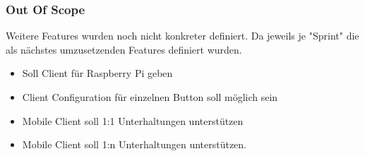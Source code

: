 \subsubsection*{Out Of Scope}

Weitere Features wurden noch nicht konkreter definiert. Da jeweils je "Sprint" die als nächstes umzusetzenden Features definiert wurden.

\begin{itemize}
    \item Soll Client für Raspberry Pi geben
    \item Client Configuration für einzelnen Button soll möglich sein
    \item Mobile Client soll 1:1 Unterhaltungen unterstützen
    \item Mobile Client soll 1:n Unterhaltungen unterstützen.
\end{itemize}



